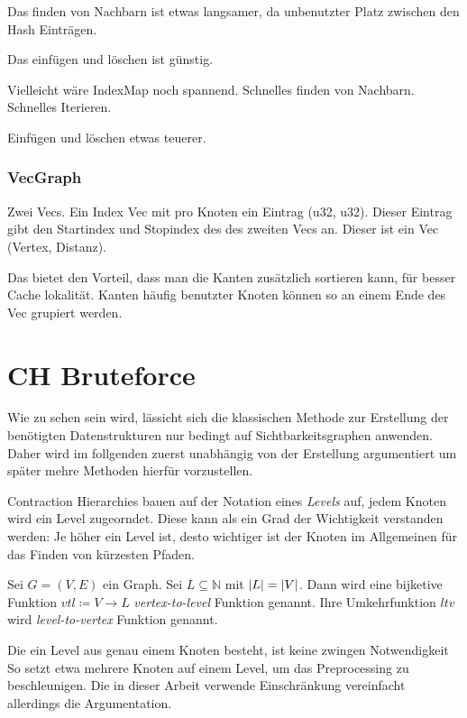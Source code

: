 Das finden von Nachbarn ist etwas langsamer, da unbenutzter Platz zwischen den Hash Einträgen.

Das einfügen und löschen ist günstig.

Vielleicht wäre IndexMap noch spannend.
Schnelles finden von Nachbarn.
Schnelles Iterieren.

Einfügen und löschen etwas teuerer.

\subsection{VecGraph}
Zwei Vecs.
Ein Index Vec mit pro Knoten ein Eintrag (u32, u32).
Dieser Eintrag gibt den Startindex und Stopindex des des zweiten Vecs an.
Dieser ist ein Vec (Vertex, Distanz).

Das bietet den Vorteil, dass man die Kanten zusätzlich sortieren kann, für besser Cache lokalität.
Kanten häufig benutzter Knoten können so an einem Ende des Vec grupiert werden.

\chapter{CH Bruteforce}

Wie zu sehen sein wird, lässicht sich die klassischen Methode zur Erstellung der benötigten Datenstrukturen nur bedingt auf Sichtbarkeitsgraphen anwenden.
Daher wird im follgenden zuerst unabhängig von der Erstellung argumentiert um später mehre Methoden hierfür vorzustellen.

Contraction Hierarchies bauen auf der Notation eines \emph{Levels} auf, jedem Knoten wird ein Level zugeorndet.
Diese kann als ein Grad der Wichtigkeit verstanden werden:
Je höher ein Level ist, desto wichtiger ist der Knoten im Allgemeinen für das Finden von kürzesten Pfaden.

\begin{definition}[Level]
    Sei $G = (V, E)$ ein Graph.
    Sei $L \subseteq \mathbb{N}$ mit $\abs{L} = \abs{V}$.
    Dann wird eine bijketive Funktion ${vtl} \coloneq V \to L$ \emph{vertex-to-level} Funktion genannt.
    Ihre Umkehrfunktion ${ltv}$ wird \emph{level-to-vertex} Funktion genannt.
\end{definition}

Die ein Level aus genau einem Knoten besteht, ist keine zwingen Notwendigkeit
So setzt \cite{vetter2009parallel} etwa mehrere Knoten auf einem Level, um das Preprocessing zu beschleunigen.
Die in dieser Arbeit verwende Einschränkung vereinfacht allerdings die Argumentation.

